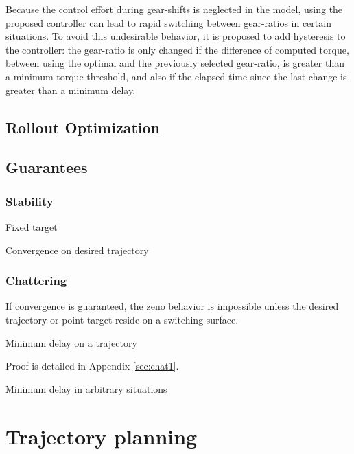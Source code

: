 Because the control effort during gear-shifts is neglected in the model, using the proposed controller can lead to rapid switching between gear-ratios in certain situations. To avoid this undesirable behavior, it is proposed to add hysteresis to the controller: the gear-ratio is only changed if the difference of computed torque, between using the optimal and the previously selected gear-ratio, is greater than a minimum torque threshold, and also if the elapsed time since the last change is greater than a minimum delay. 



\subsection{Rollout Optimization}




\subsection{Guarantees}


\subsubsection{Stability}

Fixed target

Convergence on desired trajectory


\subsubsection{Chattering}


If convergence is guaranteed, the zeno behavior is impossible unless the desired trajectory or point-target reside on a switching surface. 


Minimum delay on a trajectory

Proof is detailed in Appendix \ref{sec:chat1}.

Minimum delay in arbitrary situations





\newpage
\section{Trajectory planning}
\label{sec:SamplingBasedTrajectoryPlanner}



